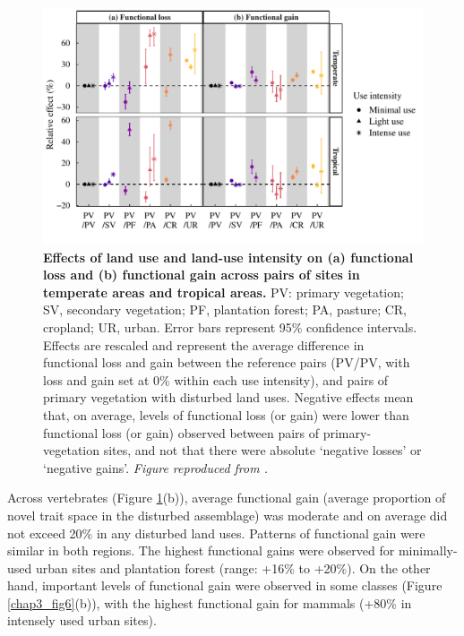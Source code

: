 \begin{figure}[h!]
\centering
\includegraphics[scale=0.75]{figures/Chapter_FD/Figure5}
\caption[Effects of land use and land-use intensity on (a) functional loss and (b) functional gain across pairs of sites in temperate areas and tropical areas.]{\textbf{Effects of land use and land-use intensity on (a) functional loss and (b) functional gain across pairs of sites in temperate areas and tropical areas.} PV: primary vegetation; SV, secondary vegetation; PF, plantation forest; PA, pasture; CR, cropland; UR, urban. Error bars represent 95\% confidence intervals. Effects are rescaled and represent the average difference in functional loss and gain between the reference pairs (PV/PV, with loss and gain set at 0\% within each use intensity), and pairs of primary vegetation with disturbed land uses. Negative effects mean that, on average, levels of functional loss (or gain) were lower than functional loss (or gain) observed between pairs of primary-vegetation sites, and not that there were absolute `negative losses' or `negative gains'. \textit{Figure reproduced from \citet{Etard2021}.}}
\label{chap3_fig5}
\end{figure}

Across vertebrates (Figure \ref{chap3_fig5}(b)), average functional gain (average proportion of novel trait space in the disturbed assemblage) was moderate and on average did not exceed 20\% in any disturbed land uses. Patterns of functional gain were similar in both regions. The highest functional gains were observed for minimally-used urban sites and plantation forest (range: +16\% to +20\%). On the other hand, important levels of functional gain were observed in some classes (Figure \ref{chap3_fig6}(b)), with the highest functional gain for mammals (+80\% in intensely used urban sites).

